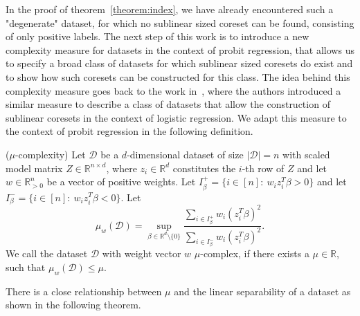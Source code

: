 In the proof of theorem~\ref{theorem:index}, we have already encountered
such a "degenerate" dataset, for which no sublinear sized coreset can be found,
consisting of only positive labels.
The next step of this work is to introduce a new complexity measure
for datasets in the context of probit regression, that allows us
to specify a broad class of datasets for which sublinear sized
coresets do exist and to show how such coresets can be constructed
for this class.
The idea behind this complexity measure goes back to
the work in~\cite{on-coresets}, where the authors introduced a similar
measure to describe a class of datasets that allow the construction
of sublinear coresets in the context of logistic regression.
We adapt this measure to the context of probit regression in the
following definition.

\begin{definition}($\mu$-complexity)
    \label{def:mu}
    Let $\mathcal{D}$ be a $d$-dimensional dataset of size
    $|\mathcal{D}|=n$ with scaled
    model matrix $Z \in \mathbb{R}^{n \times d}$, where
    $z_i \in \mathbb{R}^d$ constitutes the $i$-th
    row of $Z$ and let
    $w \in \mathbb{R}^n_{>0}$ be a vector of positive weights.
    Let $I_\beta^+ = \{i \in [n]:\ w_i z_i^T \beta > 0 \}$
    and let $I_\beta^- = \{i \in [n]:\ w_i z_i^T \beta < 0 \}$.
    Let
    \begin{equation*}
        \mu_w(\mathcal{D}) = \sup_{\beta \in \mathbb{R}^d \setminus \{0\}}
        \frac{\sum_{i \in I_\beta^+} w_i (z_i^T \beta)^2}
        {\sum_{i \in I_\beta^-} w_i (z_i^T \beta)^2}.
    \end{equation*}
    We call the dataset $\mathcal{D}$ with weight vector $w$
    $\mu$-complex, if there exists a $\mu \in \mathbb{R}$,
    such that $\mu_w(\mathcal{D}) \leq \mu$.
\end{definition}

There is a close relationship between $\mu$ and the linear
separability of a dataset as shown in the following theorem.

